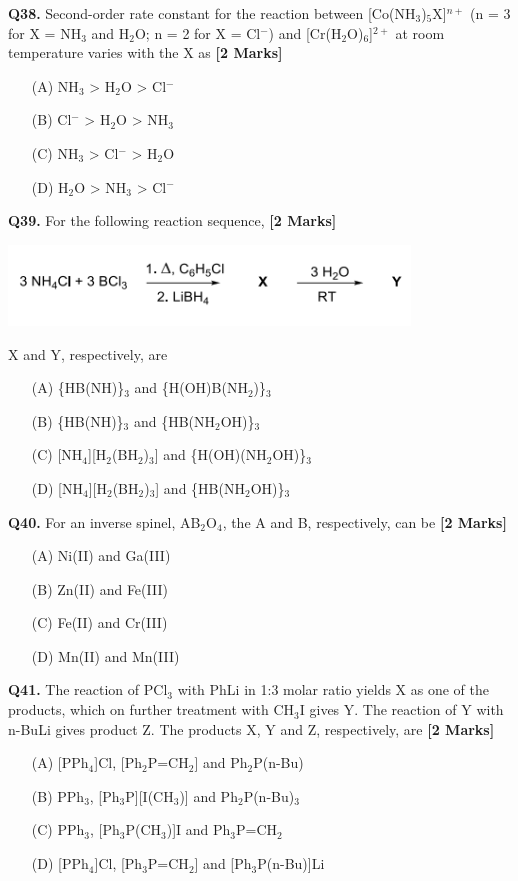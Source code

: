 \documentclass[11pt]{article}
\newcommand{\questionb}[2]{
    \noindent\textbf{Q#2.} #1 \hfill \textbf{[2 Marks]}
}
\begin{document}
\questionb{Second-order rate constant for the reaction between [Co(NH$_3$)$_5$X]$^{n+}$ (n = 3 for X = NH$_3$ and H$_2$O; n = 2 for X = Cl$^-$) and [Cr(H$_2$O)$_6$]$^{2+}$ at room temperature varies with the X as}{38}
\begin{enumerate}
    \item[(A)] NH$_3$ > H$_2$O > Cl$^-$
    \item[(B)] Cl$^-$ > H$_2$O > NH$_3$
    \item[(C)] NH$_3$ > Cl$^-$ > H$_2$O
    \item[(D)] H$_2$O > NH$_3$ > Cl$^-$
\end{enumerate}
\vspace{0.5cm}

\questionb{For the following reaction sequence,}{39}
\begin{center}
\includegraphics[width=0.8\textwidth]{figures/39.png}
\end{center}
X and Y, respectively, are
\begin{enumerate}
    \item[(A)] \{HB(NH)\}$_3$ and \{H(OH)B(NH$_2$)\}$_3$
    \item[(B)] \{HB(NH)\}$_3$ and \{HB(NH$_2$OH)\}$_3$
    \item[(C)] [NH$_4$][H$_2$(BH$_2$)$_3$] and \{H(OH)(NH$_2$OH)\}$_3$
    \item[(D)] [NH$_4$][H$_2$(BH$_2$)$_3$] and \{HB(NH$_2$OH)\}$_3$
\end{enumerate}
\vspace{0.5cm}

\questionb{For an inverse spinel, AB$_2$O$_4$, the A and B, respectively, can be}{40}
\begin{enumerate}
    \item[(A)] Ni(II) and Ga(III)
    \item[(B)] Zn(II) and Fe(III)
    \item[(C)] Fe(II) and Cr(III)
    \item[(D)] Mn(II) and Mn(III)
\end{enumerate}
\vspace{0.5cm}

\questionb{The reaction of PCl$_3$ with PhLi in 1:3 molar ratio yields X as one of the products, which on further treatment with CH$_3$I gives Y. The reaction of Y with n-BuLi gives product Z. The products X, Y and Z, respectively, are}{41}
\begin{enumerate}
    \item[(A)] [PPh$_4$]Cl, [Ph$_2$P=CH$_2$] and Ph$_2$P(n-Bu)
    \item[(B)] PPh$_3$, [Ph$_3$P][I(CH$_3$)] and Ph$_2$P(n-Bu)$_3$
    \item[(C)] PPh$_3$, [Ph$_3$P(CH$_3$)]I and Ph$_3$P=CH$_2$
    \item[(D)] [PPh$_4$]Cl, [Ph$_3$P=CH$_2$] and [Ph$_3$P(n-Bu)]Li
\end{enumerate}
\vspace{0.5cm}
\end{document}
